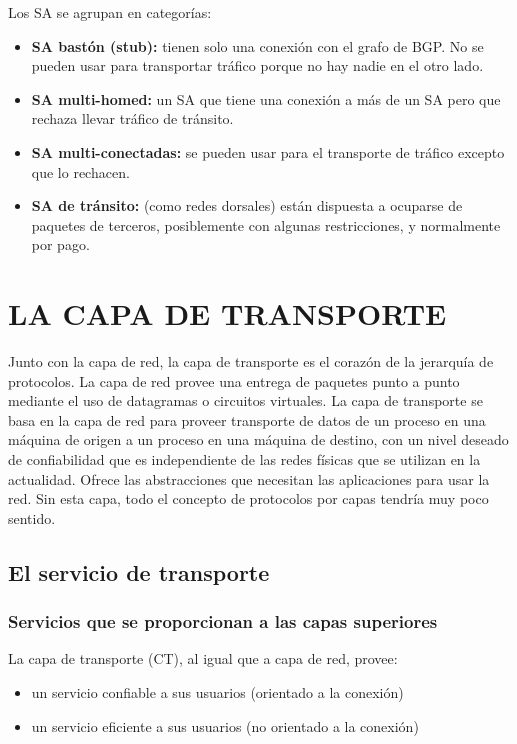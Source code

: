 \documentclass[10pt,a4paper]{report}
\begin{document}
	\par Los SA se agrupan en categorías:
	\begin{itemize}
		\item \textbf{SA bastón (stub):} tienen solo una conexión con el grafo de BGP. No se pueden usar para transportar tráfico porque no hay nadie en el otro lado.
		\item \textbf{SA multi-homed:} un SA que tiene una conexión a más de un SA pero que rechaza llevar tráfico de tránsito.
		\item \textbf{SA multi-conectadas:} se pueden usar para el transporte de tráfico excepto que lo rechacen.
		\item \textbf{SA de tránsito:} (como redes dorsales) están dispuesta a ocuparse de paquetes de terceros, posiblemente con algunas restricciones, y normalmente por pago.
	\end{itemize}
	
	
\chapter{LA CAPA DE TRANSPORTE}
\par Junto con la capa de red, la capa de transporte es el corazón de la jerarquía de 
protocolos. La capa de red provee una entrega de paquetes punto a punto mediante 
el uso de datagramas o circuitos virtuales. La capa de transporte se basa en la capa 
de red para proveer transporte de datos de un proceso en una máquina de origen a 
un proceso en una máquina de destino, con un nivel deseado de confiabilidad que es 
independiente de las redes físicas que se utilizan en la actualidad. Ofrece las 
abstracciones que necesitan las aplicaciones para usar la red. Sin esta capa, todo el 
concepto de protocolos por capas tendría muy poco sentido.


\section{El servicio de transporte}
\subsection{Servicios que se proporcionan a las capas superiores}
\par La capa de transporte (CT), al igual que a capa de red, provee:
	\begin{itemize}
		\item un servicio confiable a sus usuarios (orientado a la conexión)
		\item un servicio eficiente a sus usuarios (no orientado a la conexión)
	\end{itemize}
	
\end{document}

